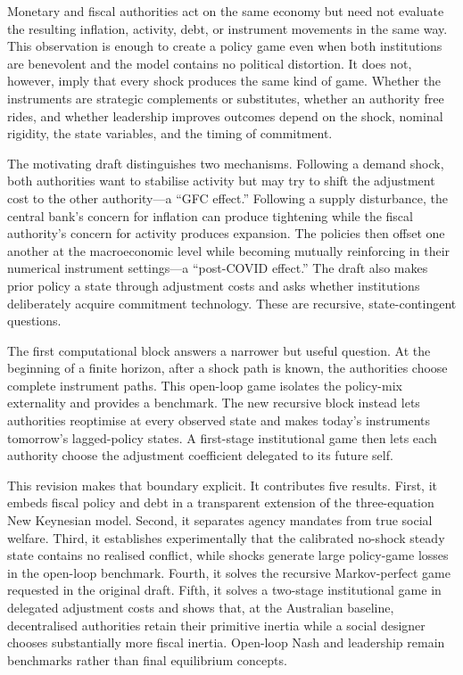 \documentclass[11pt]{article}
\begin{document}
Monetary and fiscal authorities act on the same economy but need not evaluate
the resulting inflation, activity, debt, or instrument movements in the same
way.  This observation is enough to create a policy game even when both
institutions are benevolent and the model contains no political distortion.
It does not, however, imply that every shock produces the same kind of game.
Whether the instruments are strategic complements or substitutes, whether an
authority free rides, and whether leadership improves outcomes depend on the
shock, nominal rigidity, the state variables, and the timing of commitment.

The motivating draft distinguishes two mechanisms.  Following a demand shock,
both authorities want to stabilise activity but may try to shift the adjustment
cost to the other authority---a ``GFC effect.''  Following a supply disturbance,
the central bank's concern for inflation can produce tightening while the
fiscal authority's concern for activity produces expansion.  The policies then
offset one another at the macroeconomic level while becoming mutually
reinforcing in their numerical instrument settings---a ``post-COVID effect.''
The draft also makes prior policy a state through adjustment costs and asks
whether institutions deliberately acquire commitment technology.  These are
recursive, state-contingent questions.

The first computational block answers a narrower but useful question.  At the
beginning of a finite horizon, after a shock path is known, the authorities
choose complete instrument paths.  This open-loop game isolates the policy-mix
externality and provides a benchmark.  The new recursive block instead lets
authorities reoptimise at every observed state and makes today's instruments
tomorrow's lagged-policy states.  A first-stage institutional game then lets
each authority choose the adjustment coefficient delegated to its future self.

This revision makes that boundary explicit.  It contributes five results.
First, it embeds fiscal policy and debt in a transparent extension of the
three-equation New Keynesian model.  Second, it separates agency mandates from
true social welfare.  Third, it establishes experimentally that the calibrated
no-shock steady state contains no realised conflict, while shocks generate
large policy-game losses in the open-loop benchmark.  Fourth, it solves the
recursive Markov-perfect game requested in the original draft.  Fifth, it
solves a two-stage institutional game in delegated adjustment costs and shows
that, at the Australian baseline, decentralised authorities retain their
primitive inertia while a social designer chooses substantially more fiscal
inertia.  Open-loop Nash and leadership remain benchmarks rather than final
equilibrium concepts.
\end{document}
